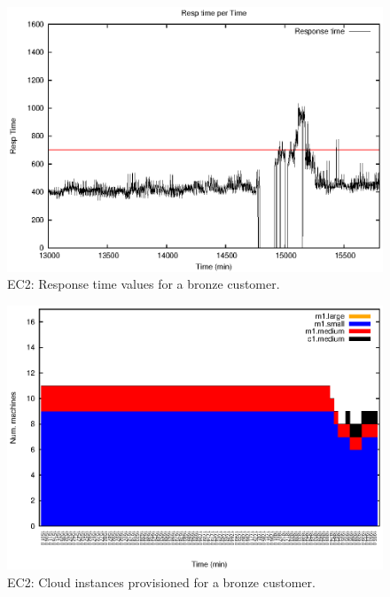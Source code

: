 \begin{figure}
  \begin{center}
    \includegraphics[width=.85\linewidth]{images/exps2011/low/ec2/proxyDataPoints_output_filtered.eps}
  \end{center}
\vspace{-5mm}
  \caption{EC2: Response time values for a bronze customer.}
  \label{lowResponseTime}
\end{figure}

\begin{figure}
  \begin{center}
    \includegraphics[width=.85\linewidth]{images/exps2011/low/ec2/inst_type_machines_filtered.eps}
  \end{center}
\vspace{-5mm}
  \caption{EC2: Cloud instances provisioned for a bronze customer.}
  \label{lowInstances}
\end{figure}

